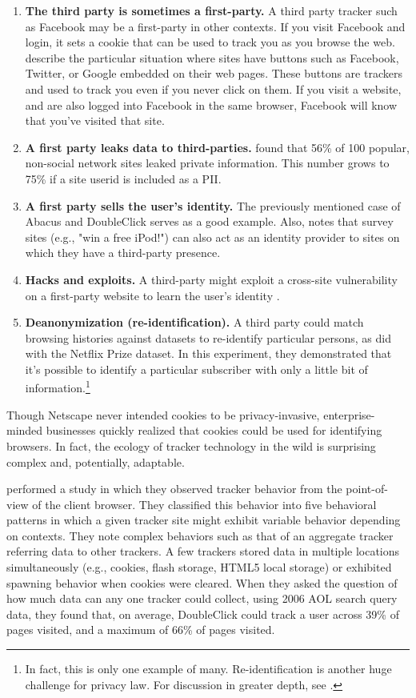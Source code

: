 \begin{enumerate}
\item \textbf{The third party is sometimes a first-party.} A third party tracker such as Facebook may be a first-party in other contexts. If you visit Facebook and login, it sets a cookie that can be used to track you as you browse the web. \cite*{Roesner:2012uj} describe the particular situation where sites have buttons such as Facebook, Twitter, or Google embedded on their web pages. These buttons are trackers and used to track you even if you never click on them. If you visit a website, and are also logged into Facebook in the same browser, Facebook will know that you've visited that site.
\item \textbf{A first party leaks data to third-parties.} \cite*{Krishnamurthy:2011uv} found that 56\% of 100 popular, non-social network sites leaked private information. This number grows to 75\% if a site userid is included as a PII.
\item \textbf{A first party sells the user's identity.} The previously mentioned case of Abacus and DoubleClick serves as a good example. Also, \cite{Narayanan:2011tv} notes that survey sites (e.g., "win a free iPod!") can also act as an identity provider to sites on which they have a third-party presence.
\item \textbf{Hacks and exploits.} A third-party might exploit a cross-site vulnerability on a first-party website to learn the user's identity \citep{Narayanan:2011tv}.
\item \textbf{Deanonymization (re-identification).} A third party could match browsing histories against datasets to re-identify particular persons, as \cite{Narayanan:2010kb} did with the Netflix Prize dataset. In this experiment, they demonstrated that it's possible to identify a particular subscriber with only a little bit of information.\footnote{In fact, this is only one example of many. Re-identification is another huge challenge for privacy law. For discussion in greater depth, see \citet{Ohm:2010vj}.}
\end{enumerate}

Though Netscape never intended cookies to be privacy-invasive, enterprise-minded businesses quickly realized that cookies could be used for identifying browsers. In fact, the ecology of tracker technology in the wild is surprising complex and, potentially, adaptable.

 \cite{Roesner:2012uj}  performed a study in which they observed tracker behavior from the point-of-view of the client browser. They classified this behavior into five behavioral patterns in which a given tracker site might exhibit variable behavior depending on contexts. They note complex behaviors such as that of an aggregate tracker referring data to other trackers. A few trackers stored data in multiple locations simultaneously (e.g., cookies, flash storage, HTML5 local storage) or exhibited spawning behavior when cookies were cleared. When they asked the question of how much data can any one tracker could collect, using 2006 AOL search query data, they found that, on average, DoubleClick could track a user across 39\% of pages visited, and a maximum of 66\% of pages visited.

